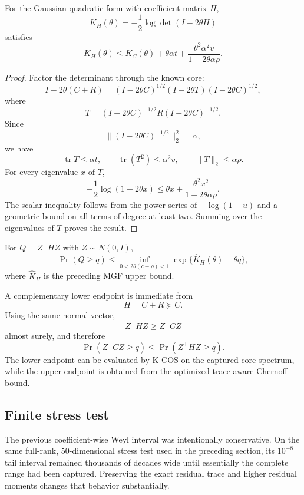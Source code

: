 \begin{theorem}\label{claim:final-23-2}
For the Gaussian quadratic form with coefficient matrix \(H\),
\[
K_H(\theta)
=-\frac12\log\det(I-2\theta H)
\]
satisfies
\[
\boxed{
K_H(\theta)
\le
K_C(\theta)
+
\theta\alpha t
+
\frac{\theta^2\alpha^2v}
     {1-2\theta\alpha\rho}.
}
\]
\end{theorem}

\begin{proof}
Factor the determinant through the known core:
\[
I-2\theta(C+R)
=
(I-2\theta C)^{1/2}
(I-2\theta T)
(I-2\theta C)^{1/2},
\]
where
\[
T=(I-2\theta C)^{-1/2}
R
(I-2\theta C)^{-1/2}.
\]
Since
\[
\|(I-2\theta C)^{-1/2}\|_2^2=\alpha,
\]
we have
\[
\operatorname{tr}T\le\alpha t,
\qquad
\operatorname{tr}(T^2)\le\alpha^2v,
\qquad
\|T\|_2\le\alpha\rho.
\]
For every eigenvalue \(x\) of \(T\),
\[
-\frac12\log(1-2\theta x)
\le
\theta x
+
\frac{\theta^2x^2}
     {1-2\theta\alpha\rho}.
\]
The scalar inequality follows from the power series of \(-\log(1-u)\) and a
geometric bound on all terms of degree at least two.  Summing over the
eigenvalues of \(T\) proves the result.
\end{proof}

\begin{corollary}\label{claim:final-23-3}
For \(Q=Z^\top HZ\) with \(Z\sim N(0,I)\),
\[
\boxed{
\Pr(Q\ge q)
\le
\inf_{0<2\theta(c+\rho)<1}
\exp\{\widehat K_H(\theta)-\theta q\},
}
\]
where \(\widehat K_H\) is the preceding MGF upper bound.
\end{corollary}

A complementary lower endpoint is immediate from
\[
H=C+R\succeq C.
\]
Using the same normal vector,
\[
Z^\top HZ\ge Z^\top CZ
\]
almost surely, and therefore
\[
\boxed{
\Pr(Z^\top CZ\ge q)
\le
\Pr(Z^\top HZ\ge q).
}
\]
The lower endpoint can be evaluated by K-COS on the captured core spectrum,
while the upper endpoint is obtained from the optimized trace-aware Chernoff
bound.

\subsection{Finite stress test}

The previous coefficient-wise Weyl interval was intentionally conservative.
On the same full-rank, 50-dimensional stress test used in the preceding
section, its \(10^{-8}\) tail interval remained thousands of decades wide
until essentially the complete range had been captured.  Preserving the exact
residual trace and higher residual moments changes that behavior substantially.

